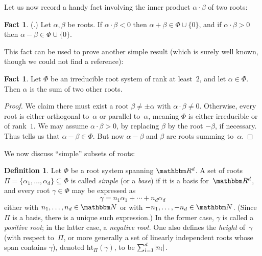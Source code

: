 \documentclass[10pt,a4paper]{article}
\theoremstyle{definition}
\newtheorem{definition}[theorem]{Definition}
\newtheorem{fact}[theorem]{Fact}
\newcommand{\R}{\mathbbm R}
\newcommand{\N}{\mathbbm N}
\DeclarePairedDelimiter\abs{\lvert}{\rvert}
\newcommand{\hgt}{{\mathrm{ht}}}
\begin{document}
Let us now record a handy fact involving the inner product $\alpha \cdot \beta$ of two roots:
\begin{fact}    \label{rootsum}
    (\cite[p.~45, Lem.~9.4]{Hum72}.)
    Let $\alpha, \beta$ be roots.  If $\alpha \cdot \beta < 0$ then $\alpha+\beta \in \Phi \cup \{0\}$, and if $\alpha \cdot \beta > 0$ then $\alpha-\beta \in \Phi \cup \{0\}$.
\end{fact}
This fact can be used to prove another simple result (which is surely well known, though we could not find a reference):
\begin{fact}    \label{fact:rootdecomp}
    Let $\Phi$ be an irreducible root system of rank at least~$2$, and let $\alpha \in \Phi$.  Then $\alpha$ is the sum of two other roots.
\end{fact}
\begin{proof}
    We claim there must exist a root $\beta \neq \pm \alpha$ with $\alpha \cdot \beta \neq 0$.
    Otherwise, every root is either orthogonal to~$\alpha$ or parallel to~$\alpha$, meaning $\Phi$ is either irreducible or of rank~$1$.
    We may assume $\alpha \cdot \beta > 0$, by replacing $\beta$ by the root $-\beta$, if necessary.
    Thus  tells us that $\alpha - \beta \in \Phi$.
    But now $\alpha - \beta$ and $\beta$ are roots summing to~$\alpha$.
\end{proof}



We now discuss ``simple'' subsets of roots:
\begin{definition}  \label{def:simple}
    Let $\Phi$ be a root system spanning $\R^d$.
    A set of roots $\Pi = \{\alpha_1, \dots, \alpha_d\} \subseteq \Phi$ is called \emph{simple} (or a \emph{base}) if it is a basis for~$\R^d$, and
    every root $\gamma \in \Phi$ may be expressed as
    \[
        \gamma = n_1 \alpha_1 + \cdots + n_d \alpha_d
    \]
    either with $n_1, \dots, n_d \in \N$ or with $-n_1, \dots, -n_d \in \N$.
    (Since $\Pi$ is a basis, there is a unique such expression.)
    In the former case, $\gamma$ is called a \emph{positive root}; in the latter case,  a \emph{negative root}.
    One also defines the \emph{height} of~$\gamma$ (with respect to~$\Pi$, or more generally a set of linearly independent roots whose span contains $\gamma$), denoted $\hgt_\Pi(\gamma)$, to be $\sum_{i=1}^d \abs{n_i}$.
\end{definition}
\end{document}
